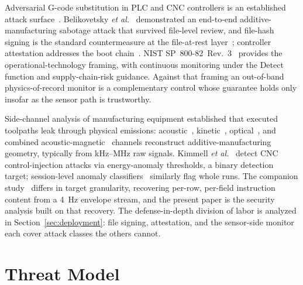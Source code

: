 \documentclass[sensors,article,submit,moreauthors,pdftex]{Definitions/mdpi}
\newcommand{\etal}{\textit{et al.}}
\begin{document}
Adversarial G-code substitution in PLC and CNC controllers is an established attack surface~\cite{zonouz2014plc,sturm2014cyber,yampolskiy2018security,kimmell2025cnc}. Belikovetsky \etal~\cite{belikovetsky2017drowned} demonstrated an end-to-end additive-manufacturing sabotage attack that survived file-level review, and file-hash signing is the standard countermeasure at the file-at-rest layer~\cite{belikovetsky2017drowned,nist2024fmnet}; controller attestation addresses the boot chain~\cite{zonouz2014plc}. NIST SP~800-82~Rev.~3~\cite{nist2023sp80082} provides the operational-technology framing, with continuous monitoring under the Detect function and supply-chain-risk guidance. Against that framing an out-of-band physics-of-record monitor is a complementary control whose guarantee holds only insofar as the sensor path is trustworthy.

Side-channel analysis of manufacturing equipment established that executed toolpaths leak through physical emissions: acoustic~\cite{alfaruque2016acoustic,song2016my}, kinetic~\cite{chhetri2016kcad}, optical~\cite{chattopadhyay2025video}, and combined acoustic-magnetic~\cite{jamarani2024screg} channels reconstruct additive-manufacturing geometry, typically from kHz--MHz raw signals. Kimmell \etal~\cite{kimmell2025cnc} detect CNC control-injection attacks via energy-anomaly thresholds, a binary detection target; session-level anomaly classifiers~\cite{coelho2024anomaly} similarly flag whole runs. The companion study~\cite{decoder_paper} differs in target granularity, recovering per-row, per-field instruction content from a 4~Hz envelope stream, and the present paper is the security analysis built on that recovery. The defense-in-depth division of labor is analyzed in Section~\ref{sec:deployment}: file signing, attestation, and the sensor-side monitor each cover attack classes the others cannot.

\section{Threat Model}
\label{sec:threat-model}
\end{document}
